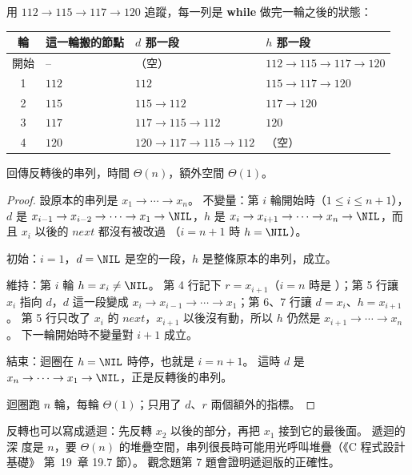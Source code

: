 用 $112 \to 115 \to 117 \to 120$ 追蹤，每一列是 \textbf{while} 做完一輪之後的狀態：

\begin{center}
\begin{tabular}{clll}
\toprule
輪 & 這一輪搬的節點 & $d$ 那一段 & $h$ 那一段 \\
\midrule
開始 & -- & （空） & $112 \to 115 \to 117 \to 120$ \\
1 & $112$ & $112$ & $115 \to 117 \to 120$ \\
2 & $115$ & $115 \to 112$ & $117 \to 120$ \\
3 & $117$ & $117 \to 115 \to 112$ & $120$ \\
4 & $120$ & $120 \to 117 \to 115 \to 112$ & （空） \\
\bottomrule
\end{tabular}
\end{center}

\begin{theorem}
\label{thm:ll-reverse}
 回傳反轉後的串列，時間 $\Theta(n)$，額外空間 $\Theta(1)$。
\end{theorem}

\begin{proof}
設原本的串列是 $x_1 \to \cdots \to x_n$。 不變量：第 $i$ 輪開始時（$1 \le i \le
n + 1$），$d$ 是 $x_{i-1} \to x_{i-2} \to \cdots \to x_1 \to \NIL$，$h$ 是 $x_i \to
x_{i+1} \to \cdots \to x_n \to \NIL$，而且 $x_i$ 以後的 $\mathit{next}$ 都沒有被改過
（$i = n + 1$ 時 $h = \NIL$）。

初始：$i = 1$，$d = \NIL$ 是空的一段，$h$ 是整條原本的串列，成立。

維持：第 $i$ 輪 $h = x_i \ne \NIL$。 第 4 行記下 $r = x_{i+1}$（$i = n$ 時是
\NIL）；第 5 行讓 $x_i$ 指向 $d$，$d$ 這一段變成 $x_i \to x_{i-1} \to \cdots \to
x_1$；第 6、7 行讓 $d = x_i$、$h = x_{i+1}$。 第 5 行只改了 $x_i$ 的
$\mathit{next}$，$x_{i+1}$ 以後沒有動，所以 $h$ 仍然是 $x_{i+1} \to \cdots \to x_n$。
下一輪開始時不變量對 $i + 1$ 成立。

結束：迴圈在 $h = \NIL$ 時停，也就是 $i = n + 1$。 這時 $d$ 是 $x_n \to \cdots \to
x_1 \to \NIL$，正是反轉後的串列。

迴圈跑 $n$ 輪，每輪 $\Theta(1)$；只用了 $d$、$r$ 兩個額外的指標。
\end{proof}

反轉也可以寫成遞迴：先反轉 $x_2$ 以後的部分，再把 $x_1$ 接到它的最後面。 遞迴的深
度是 $n$，要 $\Theta(n)$ 的堆疊空間，串列很長時可能用光呼叫堆疊（《C 程式設計基礎》
第~19~章 19.7 節）。 觀念題第 7 題會證明遞迴版的正確性。

